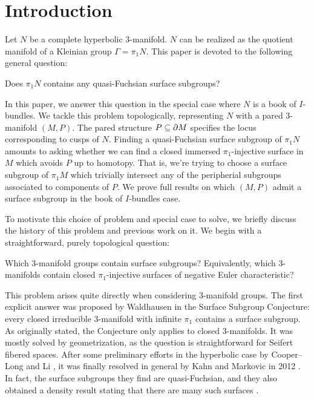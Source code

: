 \section{Introduction}

Let $N$ be a complete hyperbolic 3-manifold. $N$ can be realized as the
quotient manifold of a Kleinian group $\Gamma=\pi_1N$. This paper is devoted to
the following general question:

\begin{prob}

Does $\pi_1N$ contains any quasi-Fuchsian surface subgroups?

\end{prob}

In this paper, we answer this question in the special case where $N$ is a book
of $I$-bundles. We tackle this problem topologically, representing $N$ with
a pared 3-manifold $(M,P)$.  The pared structure $P\subseteq\partial M$ specifies the
locus corresponding to cusps of $N$. Finding a quasi-Fuchsian surface subgroup
of $\pi_1N$ amounts to asking whether we can find a closed immersed
$\pi_1$-injective surface in $M$ which avoids $P$ up to homotopy.  That is,
we're trying to choose a surface subgroup of $\pi_1M$ which trivially intersect
any of the peripherial subgroups associated to components of $P$. We prove full
results on which $(M,P)$ admit a surface subgroup in the book of $I$-bundles
case.

To motivate this choice of problem and special case to solve, we briefly
discuss the history of this problem and previous work on it. We begin with
a straightforward, purely topological question:

\begin{prob}

Which 3-manifold groups contain surface subgroups? Equivalently, which
3-manifolds contain closed $\pi_1$-injective surfaces of negative Euler
characteristic?

\end{prob}

This problem arises quite directly when considering 3-manifold groups. The
first explicit answer was proposed by Waldhausen \cite{Kirby} in
the Surface Subgroup Conjecture: every closed irreducible 3-manifold with
infinite $\pi_1$ contains a surface subgroup. As originally stated, the
Conjecture only applies to closed 3-manifolds. It was mostly solved by
geometrization, as the question is straightforward for Seifert fibered spaces.
After some preliminary efforts in the hyperbolic case by Cooper--Long
\cite{CooperLong} and Li \cite{Li}, it was finally resolved in general by Kahn
and Markovic in 2012 \cite{KM}.  In fact, the surface subgroups they find are
quasi-Fuchsian, and they also obtained a density result stating that there are
many such surfaces \cite{KM2}.

